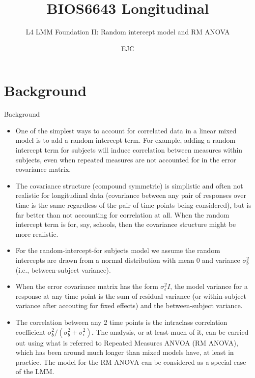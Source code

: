 \documentclass[
  9pt,
  ignorenonframetext,
]{beamer}
\title{BIOS6643 Longitudinal}
\subtitle{L4 LMM Foundation II: Random intercept model and RM ANOVA}
\author{EJC}
\date{}
\institute{Department of Biostatistics \& Informatics}
\begin{document}
\frame{\titlepage}

\begin{frame}[allowframebreaks]
  \tableofcontents[hideallsubsections]
\end{frame}
\hypertarget{background}{%
\section{Background}\label{background}}

\begin{frame}{Background}
\protect\hypertarget{background-1}{}
\begin{itemize}
\item
  One of the simplest ways to account for correlated data in a linear
  mixed model is to add a random intercept term. For example, adding a
  random intercept term for subjects will induce correlation between
  measures within subjects, even when repeated measures are not
  accounted for in the error covariance matrix.
\item
  The covariance structure (compound symmetric) is simplistic and often
  not realistic for longitudinal data (covariance between any pair of
  responses over time is the same regardless of the pair of time points
  being considered), but is far better than not accounting for
  correlation at all. When the random intercept term is for, say,
  schools, then the covariance structure might be more realistic.
\end{itemize}
\end{frame}

\begin{frame}{}
\protect\hypertarget{section}{}
\begin{itemize}
\item
  For the random-intercept-for subjects model we assume the random
  intercepts are drawn from a normal distribution with mean 0 and
  variance \(\sigma _b^2\) (i.e., between-subject variance).
\item
  When the error covariance matrix has the form \(\sigma_\epsilon^2I\),
  the model variance for a response at any time point is the sum of
  residual variance (or within-subject variance after accouting for
  fixed effects) and the between-subject variance.
\item
  The correlation between any 2 time points is the intraclass
  correlation coefficient
  \(\sigma _b^2 / (\sigma _b^2 + \sigma _\epsilon ^2)\). The analysis,
  or at least much of it, can be carried out using what is referred to
  Repeated Measures ANVOA (RM ANOVA), which has been around much longer
  than mixed models have, at least in practice. The model for the RM
  ANOVA can be considered as a special case of the LMM.
\end{itemize}
\end{frame}
\end{document}
